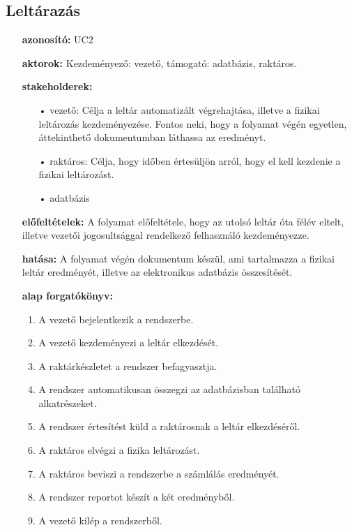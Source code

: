\documentclass[12pt]{article}\usepackage[left=20mm,right=20mm,top=15mm,bottom=20mm]{geometry}
\begin{document}
\FloatBarrier
\subsection{Leltárazás}
\begin{itemize}
\item[] \textbf{azonosító: } UC2
\item[] \textbf{aktorok: } Kezdeményező: vezető, támogató: adatbázis, raktáros.

\item[] \textbf{stakeholderek: }
\vspace*{-3mm}
\begin{itemize}
\item[•] vezető: Célja a leltár automatizált végrehajtása, illetve a fizikai leltározás kezdeményezése. Fontos neki, hogy a folyamat végén egyetlen, áttekinthető dokumentumban láthassa az eredményt.

\item[•] raktáros: Célja, hogy időben értesüljön arról, hogy el kell kezdenie a fizikai leltározást. 

\item[•] adatbázis
\end{itemize}

\item[] \textbf{előfeltételek: } A folyamat előfeltétele, hogy az utolsó leltár óta félév eltelt, illetve vezetői jogosultsággal rendelkező felhasználó kezdeményezze.

\item[] \textbf{hatása: }
A folyamat végén dokumentum készül, ami tartalmazza a fizikai leltár eredményét, illetve az elektronikus adatbázis összesítését.

\item[] \textbf{alap forgatókönyv:}
\begin{enumerate}
\item A vezető bejelentkezik a rendszerbe.
\item A vezető kezdeményezi a leltár elkezdését.
\item A raktárkészletet a rendszer befagyasztja.
\item A rendszer automatikusan összegzi az adatbázisban található alkatrészeket.
\item A rendszer értesítést küld a raktárosnak a leltár elkezdéséről.
\item A raktáros elvégzi a fizika leltározást.
\item A raktáros beviszi a rendszerbe a számlálás eredményét.
\item A rendszer reportot készít a két eredményből.
\item A vezető kilép a rendszerből.
\end{enumerate}
\end{itemize} 
\end{document}
